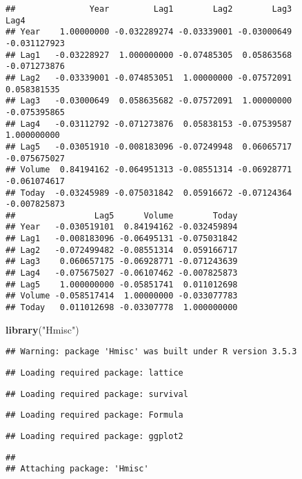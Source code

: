\documentclass[]{article}
\newenvironment{Shaded}{\begin{snugshade}}{\end{snugshade}}
\newcommand{\KeywordTok}[1]{\textcolor[rgb]{0.13,0.29,0.53}{\textbf{#1}}}
\newcommand{\StringTok}[1]{\textcolor[rgb]{0.31,0.60,0.02}{#1}}
\newcommand{\NormalTok}[1]{#1}
\begin{document}
\begin{verbatim}
##               Year         Lag1        Lag2        Lag3         Lag4
## Year    1.00000000 -0.032289274 -0.03339001 -0.03000649 -0.031127923
## Lag1   -0.03228927  1.000000000 -0.07485305  0.05863568 -0.071273876
## Lag2   -0.03339001 -0.074853051  1.00000000 -0.07572091  0.058381535
## Lag3   -0.03000649  0.058635682 -0.07572091  1.00000000 -0.075395865
## Lag4   -0.03112792 -0.071273876  0.05838153 -0.07539587  1.000000000
## Lag5   -0.03051910 -0.008183096 -0.07249948  0.06065717 -0.075675027
## Volume  0.84194162 -0.064951313 -0.08551314 -0.06928771 -0.061074617
## Today  -0.03245989 -0.075031842  0.05916672 -0.07124364 -0.007825873
##                Lag5      Volume        Today
## Year   -0.030519101  0.84194162 -0.032459894
## Lag1   -0.008183096 -0.06495131 -0.075031842
## Lag2   -0.072499482 -0.08551314  0.059166717
## Lag3    0.060657175 -0.06928771 -0.071243639
## Lag4   -0.075675027 -0.06107462 -0.007825873
## Lag5    1.000000000 -0.05851741  0.011012698
## Volume -0.058517414  1.00000000 -0.033077783
## Today   0.011012698 -0.03307778  1.000000000
\end{verbatim}

\begin{Shaded}
\begin{Highlighting}[]
\KeywordTok{library}\NormalTok{(}\StringTok{"Hmisc"}\NormalTok{)}
\end{Highlighting}
\end{Shaded}

\begin{verbatim}
## Warning: package 'Hmisc' was built under R version 3.5.3
\end{verbatim}

\begin{verbatim}
## Loading required package: lattice
\end{verbatim}

\begin{verbatim}
## Loading required package: survival
\end{verbatim}

\begin{verbatim}
## Loading required package: Formula
\end{verbatim}

\begin{verbatim}
## Loading required package: ggplot2
\end{verbatim}

\begin{verbatim}
## 
## Attaching package: 'Hmisc'
\end{verbatim}
\end{document}
